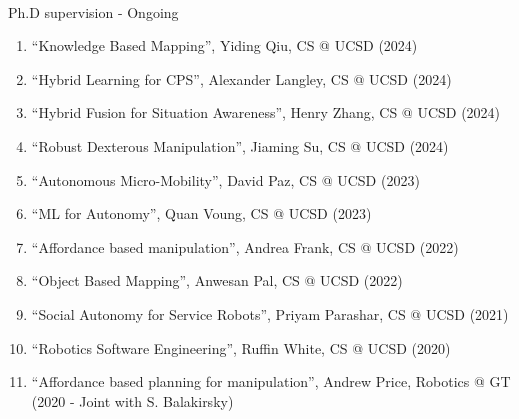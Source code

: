 \documentclass{article}
\begin{document}
\begin{cv}


\begin{cvlist}{~}

\item[Ph.D supervision - Ongoing]\ \\
  \begin{enumerate}
  \item ``Knowledge Based Mapping'', Yiding Qiu, CS @ UCSD (2024)
  \item ``Hybrid Learning for CPS'', Alexander Langley, CS @ UCSD (2024)
  \item ``Hybrid Fusion for Situation Awareness'', Henry Zhang, CS @
    UCSD (2024)
  \item ``Robust Dexterous Manipulation'', Jiaming Su, CS @ UCSD (2024)
  \item ``Autonomous Micro-Mobility'', David Paz, CS @ UCSD (2023)
  \item ``ML for Autonomy'', Quan Voung, CS @ UCSD (2023)
  \item ``Affordance based manipulation'', Andrea Frank, CS @ UCSD (2022)
  \item ``Object Based Mapping'', Anwesan Pal, CS @ UCSD (2022)
  \item ``Social Autonomy for Service Robots'', Priyam Parashar, CS @
    UCSD (2021)
  \item ``Robotics Software Engineering'', Ruffin White, CS @ UCSD (2020)
  \item ``Affordance based planning for manipulation'', Andrew Price,
    Robotics @ GT (2020 - Joint with S. Balakirsky)
  \end{enumerate}



\end{cvlist}
\end{cv}
\end{document}
